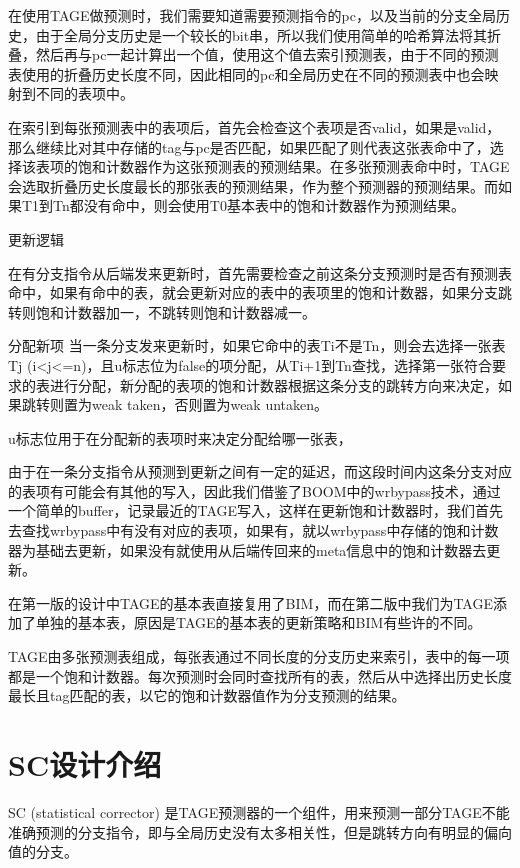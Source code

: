 在使用TAGE做预测时，我们需要知道需要预测指令的pc，以及当前的分支全局历史，由于全局分支历史是一个较长的bit串，所以我们使用简单的哈希算法将其折叠，然后再与pc一起计算出一个值，使用这个值去索引预测表，由于不同的预测表使用的折叠历史长度不同，因此相同的pc和全局历史在不同的预测表中也会映射到不同的表项中。

在索引到每张预测表中的表项后，首先会检查这个表项是否valid，如果是valid，那么继续比对其中存储的tag与pc是否匹配，如果匹配了则代表这张表命中了，选择该表项的饱和计数器作为这张预测表的预测结果。在多张预测表命中时，TAGE会选取折叠历史长度最长的那张表的预测结果，作为整个预测器的预测结果。而如果T1到Tn都没有命中，则会使用T0基本表中的饱和计数器作为预测结果。

更新逻辑

在有分支指令从后端发来更新时，首先需要检查之前这条分支预测时是否有预测表命中，如果有命中的表，就会更新对应的表中的表项里的饱和计数器，如果分支跳转则饱和计数器加一，不跳转则饱和计数器减一。

分配新项
当一条分支发来更新时，如果它命中的表Ti不是Tn，则会去选择一张表Tj (i<j<=n)，且u标志位为false的项分配，从Ti+1到Tn查找，选择第一张符合要求的表进行分配，新分配的表项的饱和计数器根据这条分支的跳转方向来决定，如果跳转则置为weak taken，否则置为weak untaken。

u标志位用于在分配新的表项时来决定分配给哪一张表，

由于在一条分支指令从预测到更新之间有一定的延迟，而这段时间内这条分支对应的表项有可能会有其他的写入，因此我们借鉴了BOOM中的wrbypass技术，通过一个简单的buffer，记录最近的TAGE写入，这样在更新饱和计数器时，我们首先去查找wrbypass中有没有对应的表项，如果有，就以wrbypass中存储的饱和计数器为基础去更新，如果没有就使用从后端传回来的meta信息中的饱和计数器去更新。

在第一版的设计中TAGE的基本表直接复用了BIM，而在第二版中我们为TAGE添加了单独的基本表，原因是TAGE的基本表的更新策略和BIM有些许的不同。

TAGE由多张预测表组成，每张表通过不同长度的分支历史来索引，表中的每一项都是一个饱和计数器。每次预测时会同时查找所有的表，然后从中选择出历史长度最长且tag匹配的表，以它的饱和计数器值作为分支预测的结果。

\section{SC设计介绍}

SC (statistical corrector) 是TAGE预测器的一个组件，用来预测一部分TAGE不能准确预测的分支指令，即与全局历史没有太多相关性，但是跳转方向有明显的偏向值的分支。

